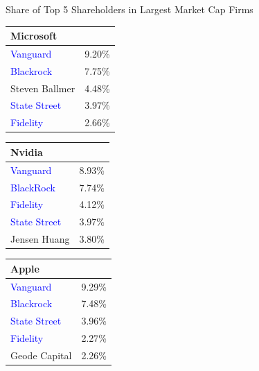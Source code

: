 \documentclass[english,aspectratio=169,handout]{beamer}
\theoremstyle{plain}
\begin{document}
\begin{frame}{Share of Top 5 Shareholders in Largest Market Cap Firms \hyperlink{intro}{}}
  \label{share}

  \begin{minipage}[t]{0.3\textwidth} %
    \centering
    \footnotesize %
    \begin{tabular}{lr}
      \toprule
      Microsoft                      &        \\
      \midrule
      \textcolor{blue}{Vanguard}     & 9.20\% \\
      \textcolor{blue}{Blackrock}    & 7.75\% \\
      Steven Ballmer                 & 4.48\% \\
      \textcolor{blue}{State Street} & 3.97\% \\
      \textcolor{blue}{Fidelity}     & 2.66\% \\
      \bottomrule
    \end{tabular}
  \end{minipage}
  \hfill %
  \begin{minipage}[t]{0.3\textwidth} %
    \centering
    \footnotesize %
    \begin{tabular}{lr}
      \toprule
      Nvidia                         &        \\
      \midrule
      \textcolor{blue}{Vanguard}     & 8.93\% \\
      \textcolor{blue}{BlackRock}    & 7.74\% \\
      \textcolor{blue}{Fidelity}     & 4.12\% \\
      \textcolor{blue}{State Street} & 3.97\% \\
      Jensen Huang                   & 3.80\% \\
      \bottomrule
    \end{tabular}
  \end{minipage}
  \hfill %
  \begin{minipage}[t]{0.3\textwidth} %
    \centering
    \footnotesize %
    \begin{tabular}{lr}
      \toprule
      Apple                          &        \\
      \midrule
      \textcolor{blue}{Vanguard}     & 9.29\% \\
      \textcolor{blue}{Blackrock}    & 7.48\% \\
      \textcolor{blue}{State Street} & 3.96\% \\
      \textcolor{blue}{Fidelity}     & 2.27\% \\
      Geode Capital                  & 2.26\% \\
      \bottomrule
    \end{tabular}
  \end{minipage}


\end{frame}
\end{document}
